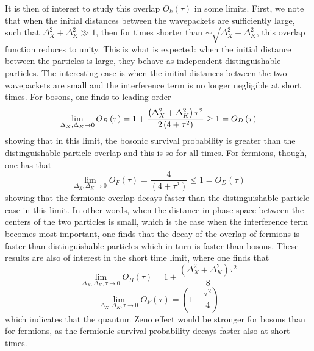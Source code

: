 \documentclass[preprint,aps]{revtex4}
\begin{document}
It is then of interest to study this overlap $ O_{k}\left( \tau \right)$ in some limits. First, we note
that when the initial distances between the wavepackets are sufficiently
large, such that $\Delta _{X}^{2}+\Delta _{K}^{2}\gg 1$, then for times
shorter than $\sim \sqrt{\Delta _{X}^{2}+\Delta _{K}^{2}}$, this overlap
function reduces to unity. This is what is expected: when the initial
distance between the particles is large, they behave as independent
distinguishable particles. The interesting case is when the initial
distances between the two wavepackets are small and the interference term is
no longer negligible at short times. For bosons, one finds to leading order
\begin{equation}
\lim_{\Delta _{X},\Delta _{K}\rightarrow 0}O_{B}\left( \tau \right) =1+\frac{%
\left( \Delta _{X}^{2}+\Delta _{K}^{2}\right)
\tau ^{2}}{2\left( 4+\tau
^{2}\right) }\geq 1 =O_{D}\left( \tau \right)   \label{2.35}
\end{equation}%
showing that in this limit, the bosonic survival probability is greater than
the distinguishable particle overlap and this is so for all times. For
fermions, though, one has that
\begin{equation}
\lim_{\Delta _{X},\Delta _{K}\rightarrow 0}O_{F}\left( \tau \right) =\frac{4%
}{\left( 4+\tau ^{2}\right) }\leq 1=O_{D}\left( \tau \right)   \label{2.37}
\end{equation}%
showing that the fermionic overlap decays faster than the distinguishable
particle case in this limit. In other words, when the distance in phase
space between the centers of the two particles is small, which is the case
when the interference term becomes most important, one finds that the decay
of the overlap of fermions is faster than distinguishable particles which in
turn is faster than bosons. These results are also of interest in the short
time limit, where one finds that%
\begin{equation}
\lim_{\Delta _{X},\Delta _{K},\tau \rightarrow 0}O_{B}\left( \tau \right) =1+%
\frac{\left( \Delta _{X}^{2}+\Delta _{K}^{2}\right) \tau ^{2}}{8}
\label{2.38}
\end{equation}%
\begin{equation}
\lim_{\Delta _{X},\Delta _{K},\tau \rightarrow 0}O_{F}\left( \tau \right)
=\left( 1-\frac{\tau ^{2}}{4}\right)   \label{2.39}
\end{equation}%
which indicates that the quantum Zeno effect \cite{Zeno1,Zeno2,Zeno3} would be stronger for bosons
than for fermions, as the fermionic survival probability decays faster also
at short times.
\end{document}
